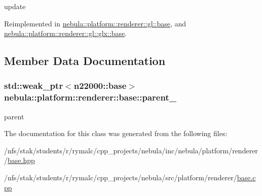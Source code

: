 update 

Reimplemented in \hyperlink{classnebula_1_1platform_1_1renderer_1_1gl_1_1base_a9f5ba209a04711ace2516875da5c1aa3}{nebula::platform::renderer::gl::base}, and \hyperlink{classnebula_1_1platform_1_1renderer_1_1gl_1_1glx_1_1base_a7d641192feb417180195053cd58dcf7d}{nebula::platform::renderer::gl::glx::base}.

\subsection{Member Data Documentation}
\hypertarget{classnebula_1_1platform_1_1renderer_1_1base_ab07a2967a0fcd427c5429bc0a67d5b0d}{
\subsubsection[{parent\_\-}]{\setlength{\rightskip}{0pt plus 5cm}std::weak\_\-ptr$<${\bf n22000::base}$>$ {\bf nebula::platform::renderer::base::parent\_\-}}}
\label{classnebula_1_1platform_1_1renderer_1_1base_ab07a2967a0fcd427c5429bc0a67d5b0d}


parent 

The documentation for this class was generated from the following files:\begin{DoxyCompactItemize}
\item 
/nfs/stak/students/r/rymalc/cpp\_\-projects/nebula/inc/nebula/platform/renderer/\hyperlink{inc_2nebula_2platform_2renderer_2base_8hpp}{base.hpp}\item 
/nfs/stak/students/r/rymalc/cpp\_\-projects/nebula/src/platform/renderer/\hyperlink{src_2platform_2renderer_2base_8cpp}{base.cpp}\end{DoxyCompactItemize}
